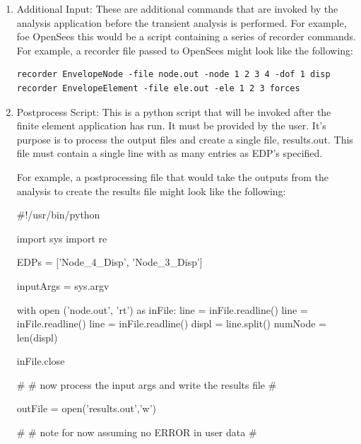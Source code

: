 \begin{enumerate}
\item Additional Input: These are additional commands that are invoked
  by the analysis application before the transient analysis is
  performed. For example, foe OpenSees this would be a script
  containing a series of recorder commands. \\

For example, a recorder file passed to OpenSees might look like the following:
\begin{verbatim}
recorder EnvelopeNode -file node.out -node 1 2 3 4 -dof 1 disp
recorder EnvelopeElement -file ele.out -ele 1 2 3 forces
\end{verbatim}

\item Postprocess Script: This is a python script that will be invoked
  after the finite element application has run. It must be provided by
  the user. It's purpose is to process the output files and create a
  single file, results.out. This file must contain a single line with
  as many entries as EDP's specified.

For example, a postprocessing file that would take the outputs from the analysis to create the results file might look like the following:

\begin{python}
#!/usr/bin/python                                                                 

import sys
import re

EDPs = ['Node_4_Disp', 'Node_3_Disp']

inputArgs = sys.argv

with open ('node.out', 'rt') as inFile:
    line = inFile.readline()
    line = inFile.readline()
    line = inFile.readline()
    displ = line.split()
    numNode = len(displ)

inFile.close

#                                                                                 
# now process the input args and write the results file                           
#                                                                                 

outFile = open('results.out','w')

#                                                                                 
# note for now assuming no ERROR in user data                                     
#                                                                                 


\end{python}
\end{enumerate}

